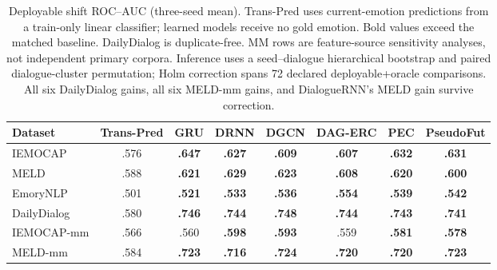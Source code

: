 \documentclass{ieeeaccess}
\begin{document}
\begin{table}[t]
\centering
\footnotesize
\caption{Deployable shift ROC--AUC (three-seed mean). Trans-Pred uses current-emotion predictions
from a train-only linear classifier; learned models receive no gold emotion. Bold values exceed the
matched baseline. DailyDialog is duplicate-free. MM rows are feature-source sensitivity analyses,
not independent primary corpora. Inference uses a seed--dialogue hierarchical bootstrap and paired
dialogue-cluster permutation; Holm correction spans 72 declared deployable+oracle comparisons.
All six DailyDialog gains, all six MELD-mm gains, and DialogueRNN's MELD gain survive correction.}
\label{tab:main}
\begin{tabular}{lccccccc}\toprule
Dataset & Trans-Pred & GRU & DRNN & DGCN & DAG-ERC & PEC & PseudoFut \\
\midrule
IEMOCAP      & .576 & \textbf{.647} & \textbf{.627} & \textbf{.609} & \textbf{.607} & \textbf{.632} & \textbf{.631} \\
MELD         & .588 & \textbf{.621} & \textbf{.629} & \textbf{.623} & \textbf{.608} & \textbf{.620} & \textbf{.600} \\
EmoryNLP     & .501 & \textbf{.521} & \textbf{.533} & \textbf{.536} & \textbf{.554} & \textbf{.539} & \textbf{.542} \\
DailyDialog  & .580 & \textbf{.746} & \textbf{.744} & \textbf{.748} & \textbf{.744} & \textbf{.743} & \textbf{.741} \\
IEMOCAP-mm   & .566 & .560 & \textbf{.598} & \textbf{.593} & .559 & \textbf{.581} & \textbf{.578} \\
MELD-mm      & .584 & \textbf{.723} & \textbf{.716} & \textbf{.724} & \textbf{.720} & \textbf{.720} & \textbf{.723} \\
\bottomrule
\end{tabular}
\end{table}
\end{document}
